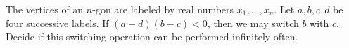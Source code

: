 The vertices of an $n$-gon are labeled by real numbers $x_1, \ldots, x_n$. Let $a, b, c, d$ be four successive labels. If $(a - d)(b - c) < 0$, then we may switch $b$ with $c$. Decide if this switching operation can be performed infinitely often.

